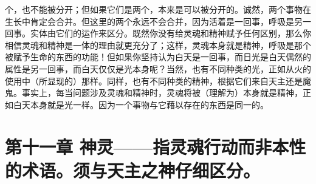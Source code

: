 个，也不能被分开；但如果它们是两个，本来是可以被分开的。诚然，两个事物在生长中肯定会合并。但这里的两个永远不会合并，因为活着是一回事，呼吸是另一回事。实体由它们的运作来区分。既然你没有给灵魂和精神赋予任何区别，那么你相信灵魂和精神是一体的理由就更充分了；这样，灵魂本身就是精神，呼吸是那个被赋予生命的东西的功能！但如果你坚持认为白天是一回事，而日光是白天偶然的属性是另一回事，而白天仅仅是光本身呢？当然，也有不同种类的光，正如从火的使用中（所显现的）那样。同样，也有不同种类的精神，根据它们来自天主还是魔鬼。事实上，每当问题涉及灵魂和精神时，灵魂将被（理解为）本身就是精神，正如白天本身就是光一样。因为一个事物与它藉以存在的东西是同一的。\par


\section{第十一章 神灵——指灵魂行动而非本性的术语。须与天主之神仔细区分。}

